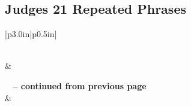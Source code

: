 \subsection{Judges 21 Repeated Phrases}


\normalsize
 
\begin{center}
\begin{longtable}{|p{3.0in}|p{0.5in}|}
\caption[Judges 21 Repeated Phrases]{Judges 21 Repeated Phrases}\label{table:Repeated Phrases Judges 21} \\
\hline {} &  \\ \hline 
\endfirsthead
 
{{\bfseries \tablename\ \thetable{} -- continued from previous page}} \\  
\hline {} &  \\ \hline 
\endhead
 

\end{longtable}
\end{center}
